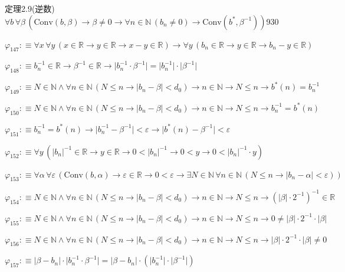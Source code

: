 \begin{fullproof}{定理2.9(逆数)}{$\forall b\,\forall \beta\,(\mathrm{Conv}(b,\beta) \to \beta \neq 0 \to \forall n \in \mathbb{N}\,(b_{n} \neq 0) \to \mathrm{Conv}(b^{\ast},\beta^{-1}))$}{930}
\begin{abbrevlist}
\item $\varphi_{147} :\equiv \forall x\,\forall y\,(x \in \mathbb{R} \to y \in \mathbb{R} \to x - y \in \mathbb{R}) \to \forall y\,(b_{n} \in \mathbb{R} \to y \in \mathbb{R} \to b_{n} - y \in \mathbb{R})$
\item $\varphi_{148} :\equiv b_{n}^{-1} \in \mathbb{R} \to \beta^{-1} \in \mathbb{R} \to \lvert b_{n}^{-1} \cdot \beta^{-1} \rvert = \lvert b_{n}^{-1} \rvert \cdot \lvert \beta^{-1} \rvert$
\item $\varphi_{149} :\equiv N \in \mathbb{N} \land \forall n \in \mathbb{N}\,(N \leq n \to \lvert b_{n} - \beta \rvert < d_{0}) \to n \in \mathbb{N} \to N \leq n \to b^{\ast}(n) = b_{n}^{-1}$
\item $\varphi_{150} :\equiv N \in \mathbb{N} \land \forall n \in \mathbb{N}\,(N \leq n \to \lvert b_{n} - \beta \rvert < d_{0}) \to n \in \mathbb{N} \to N \leq n \to b_{n}^{-1} = b^{\ast}(n)$
\item $\varphi_{151} :\equiv b_{n}^{-1} = b^{\ast}(n) \to \lvert b_{n}^{-1} - \beta^{-1} \rvert < \varepsilon \to \lvert b^{\ast}(n) - \beta^{-1} \rvert < \varepsilon$
\item $\varphi_{152} :\equiv \forall y\,(\lvert b_{n} \rvert^{-1} \in \mathbb{R} \to y \in \mathbb{R} \to 0 < \lvert b_{n} \rvert^{-1} \to 0 < y \to 0 < \lvert b_{n} \rvert^{-1} \cdot y)$
\item $\varphi_{153} :\equiv \forall \alpha\,\forall \varepsilon\,(\mathrm{Conv}(b,\alpha) \to \varepsilon \in \mathbb{R} \to 0 < \varepsilon \to \exists N \in \mathbb{N}\,\forall n \in \mathbb{N}\,(N \leq n \to \lvert b_{n} - \alpha \rvert < \varepsilon))$
\item $\varphi_{154} :\equiv N \in \mathbb{N} \land \forall n \in \mathbb{N}\,(N \leq n \to \lvert b_{n} - \beta \rvert < d_{0}) \to n \in \mathbb{N} \to N \leq n \to (\lvert \beta \rvert \cdot 2^{-1})^{-1} \in \mathbb{R}$
\item $\varphi_{155} :\equiv N \in \mathbb{N} \land \forall n \in \mathbb{N}\,(N \leq n \to \lvert b_{n} - \beta \rvert < d_{0}) \to n \in \mathbb{N} \to N \leq n \to 0 \neq \lvert \beta \rvert \cdot 2^{-1} \cdot \lvert \beta \rvert$
\item $\varphi_{156} :\equiv N \in \mathbb{N} \land \forall n \in \mathbb{N}\,(N \leq n \to \lvert b_{n} - \beta \rvert < d_{0}) \to n \in \mathbb{N} \to N \leq n \to \lvert \beta \rvert \cdot 2^{-1} \cdot \lvert \beta \rvert \neq 0$
\item $\varphi_{157} :\equiv \lvert \beta - b_{n} \rvert \cdot \lvert b_{n}^{-1} \cdot \beta^{-1} \rvert = \lvert \beta - b_{n} \rvert \cdot (\lvert b_{n}^{-1} \rvert \cdot \lvert \beta^{-1} \rvert)$

\end{abbrevlist}
\end{fullproof}
